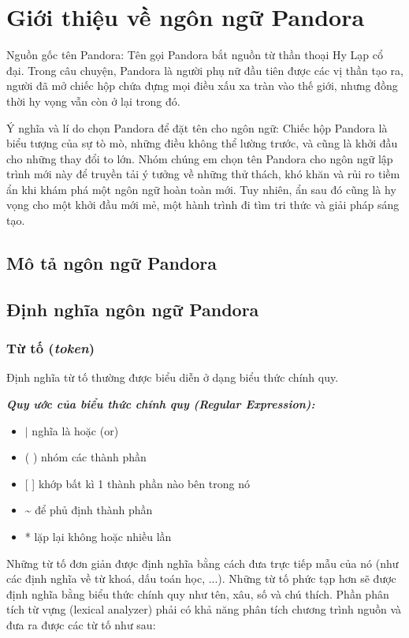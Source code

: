 \section{Giới thiệu về ngôn ngữ Pandora}
Nguồn gốc tên Pandora: 
    Tên gọi Pandora bắt nguồn từ thần thoại 
    Hy Lạp cổ đại. Trong câu chuyện, Pandora là người phụ nữ đầu tiên được 
    các vị thần tạo ra, người đã mở chiếc hộp chứa đựng mọi điều xấu xa tràn 
    vào thế giới, nhưng đồng thời hy vọng vẫn còn ở lại trong đó.

Ý nghĩa và lí do chọn Pandora để đặt tên cho ngôn ngữ: 
    Chiếc hộp Pandora là biểu tượng của sự tò mò, những điều không thể 
    lường trước, và cũng là khởi đầu cho những thay đổi to lớn. Nhóm chúng 
    em chọn tên Pandora cho ngôn ngữ lập trình mới này để truyền tải ý 
    tưởng về những thử thách, khó khăn và rủi ro tiềm ẩn khi khám phá một 
    ngôn ngữ hoàn toàn mới. Tuy nhiên, ẩn sau đó cũng là hy vọng cho một 
    khởi đầu mới mẻ, một hành trình đi tìm tri thức và giải pháp sáng tạo.


\subsection{Mô tả ngôn ngữ Pandora}
\subsection{Định nghĩa ngôn ngữ Pandora}
\subsubsection{Từ tố (\textit{token})}
Định nghĩa từ tố thường được biểu diễn ở dạng biểu thức chính quy.

\textbf{\textit{Quy ước của biểu thức chính quy (Regular Expression):}}

\begin{itemize}
    \item{$|$ nghĩa là hoặc (or)}
    \item{( ) nhóm các thành phần}
    \item{[ ] khớp bất kì 1 thành phần nào bên trong nó}
    \item{{\verbfont\textasciitilde} để phủ định thành phần}
    \item{* lặp lại không hoặc nhiều lần}
\end{itemize}

    Những từ tố đơn giản được định nghĩa bằng cách đưa trực tiếp mẫu của
nó (như các định nghĩa về từ khoá, dấu toán học, ...). Những từ tố phức tạp
hơn sẽ được định nghĩa bằng biểu thức chính quy như tên, xâu, số và chú thích.
Phần phân tích từ vựng (lexical analyzer) phải có khả năng phân tích chương trình nguồn
và đưa ra được các từ tố như sau:

